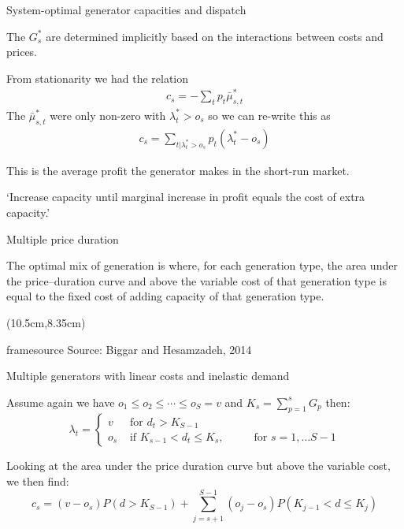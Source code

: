 \documentclass[10pt,aspectratio=169,dvipsnames]{beamer}
\def\l{\lambda}
\def\m{\mu}
\newcommand{\source}[1]{\begin{textblock*}{5cm}(10.5cm,8.35cm)
    \begin{beamercolorbox}[ht=0.5cm,right]{framesource}
        \usebeamerfont{framesource}\usebeamercolor[fg]{framesource} Source: {#1}
    \end{beamercolorbox}
\end{textblock*}}
\begin{document}
\begin{frame}{System-optimal generator capacities and dispatch}

  The $G_s^*$ are determined implicitly based on the interactions between costs and prices.

  From stationarity we had the relation
    \begin{align*}
      c_s  = - \sum_t p_t \bar{\m}^*_{s,t}
    \end{align*}
    The $\bar{\m}^*_{s,t}$ were only non-zero with $\l^*_{t} > o_s$ so we can re-write this as
    \begin{align*}
      c_s  = \sum_{t| \l^*_{t} > o_s} p_t (\l^*_{t} - o_s)
    \end{align*}

    This is the \alert{average profit the generator makes in the short-run market}.

  `Increase capacity until marginal increase in profit equals the cost of extra capacity.'

\end{frame}


\begin{frame}{Multiple price duration}

  The optimal mix of generation is where, for each generation type,
  the area under the price–duration curve and above the variable cost
  of that generation type is equal to the fixed cost of adding
  capacity of that generation type.

  \centering

  \source{Biggar and Hesamzadeh, 2014}
\end{frame}




\begin{frame}{Multiple generators with linear costs and inelastic demand}

  Assume again we have $o_1 \leq o_2 \leq \cdots \leq o_S = v$ and $K_s = \sum_{p=1}^s G_p$
  then:
  \begin{equation*}
    \l_t = \left\{ \begin{array}{ll}
      v& \textrm{ for } d_t > K_{S-1} \\
      o_s & \textrm{ if } K_{s-1} < d_t \leq K_s, \hspace{1cm} \textrm{ for } s = 1, \dots S-1
    \end{array}\right.
  \end{equation*}

  Looking at the area under the price duration curve but above the
  variable cost, we then find:
  \begin{equation*}
    c_s = (v-o_s)P(d>K_{S-1}) + \sum_{j=s+1}^{S-1} (o_j-o_s) P(K_{j-1} < d \leq K_j)
  \end{equation*}


\end{frame}
\end{document}
